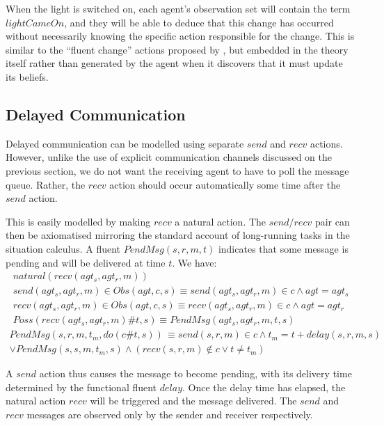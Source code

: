 When the light is switched on, each agent's observation set will contain
the term $lightCameOn$, and they will be able to deduce that this
change has occurred without necessarily knowing the specific action
responsible for the change. This is similar to the {}``fluent change''
actions proposed by \citet{degiacomo98execution_monitoring}, but
embedded in the theory itself rather than generated by the agent when
it discovers that it must update its beliefs.


\subsection{Delayed Communication\label{sec:Observations:Delayed}}

Delayed communication can be modelled using separate $send$ and $recv$
actions. However, unlike the use of explicit communication channels
discussed on the previous section, we do not want the receiving agent
to have to poll the message queue. Rather, the $recv$ action should
occur automatically some time after the $send$ action.

This is easily modelled by making $recv$ a natural action. The $send/recv$
pair can then be axiomatised mirroring the standard account of long-running
tasks in the situation calculus. A fluent $PendMsg(s,r,m,t)$ indicates
that some message is pending and will be delivered at time $t$. We
have:\begin{gather*}
natural(recv(agt_{s},agt_{r},m))\\
send(agt_{s},agt_{r},m)\in Obs(agt,c,s)\equiv send(agt_{s},agt_{r},m)\in c\wedge agt=agt_{s}\\
recv(agt_{s},agt_{r},m)\in Obs(agt,c,s)\equiv recv(agt_{s},agt_{r},m)\in c\wedge agt=agt_{r}\\
Poss(recv(agt_{s},agt_{r},m)\#t,s)\equiv PendMsg(agt_{s},agt_{r},m,t,s)\end{gather*}
 \begin{multline*}
PendMsg(s,r,m,t_{m},do(c\#t,s))\,\equiv send(s,r,m)\in c\wedge t_{m}=t+delay(s,r,m,s)\\
\vee PendMsg(s,s,m,t_{m},s)\wedge\left(recv(s,r,m)\not\in c\vee t\neq t_{m}\right)\end{multline*}


A $send$ action thus causes the message to become pending, with its
delivery time determined by the functional fluent $delay$. Once the
delay time has elapsed, the natural action $recv$ will be triggered
and the message delivered. The $send$ and $recv$ messages are observed
only by the sender and receiver respectively.

